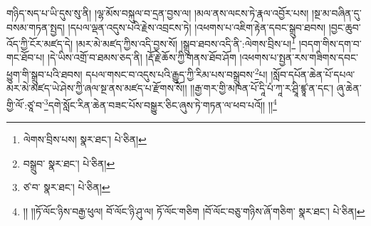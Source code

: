 གཉིད་སད་པ་ཡི་དུས་སུ་ནི། །ལྷ་མོས་བསྐུལ་བ་དྲན་བྱས་ལ། །མལ་ནས་ལངས་ཏེ་རྣལ་འབྱོར་པས། །སྔ་མ་བཞིན་དུ་བསམ་གཏན་སྤྱད། །དཔལ་ལྡན་འདུས་པའི་རྗེས་འབྲངས་ཏེ། །འཕགས་པ་འཇིག་རྟེན་དབང་སྒྲུབ་ཐབས། །བྱང་ཆུབ་འོད་ཀྱི་ངོར་མཛད་དེ། །མར་མེ་མཛད་ཀྱིས་འདི་བྱས་སོ། །སྒྲུབ་ཐབས་འདི་ནི་:ལེགས་བྲིས་པ།\footnote{ལེགས་བྲིས་པས།  སྣར་ཐང་།  པེ་ཅིན། } །བདག་གིས་དག་བ་གང་ཐོབ་པ། །དེ་ཡིས་འགྲོ་བ་ཐམས་ཅད་ནི། །རྡོ་རྗེ་ཆོས་ཀྱི་གནས་ཐོབ་ཤོག །འཕགས་པ་སྤྱན་རས་གཟིགས་དབང་ཕྱུག་གི་སྒྲུབ་པའི་ཐབས། དཔལ་གསང་བ་འདུས་པའི་རྒྱུད་ཀྱི་རིམ་པས་བསྒྲུབས་\footnote{བསྒྲུབ་  སྣར་ཐང་།  པེ་ཅིན། }པ། །སློབ་དཔོན་ཆེན་པོ་དཔལ་མར་མེ་མཛད་ཡེ་ཤེས་ཀྱི་ཞལ་སྔ་ནས་མཛད་པ་རྫོགས་སོ།། །།རྒྱ་གར་གྱི་མཁན་པོ་དཱི་པཾ་ཀཱ་ར་ཤྲཱི་ཛྙཱ་ན་དང་། ཞུ་ཆེན་གྱི་ལོ་:ཙཱ་བ་\footnote{ཙ་བ་  སྣར་ཐང་།  པེ་ཅིན། }དགེ་སློང་རིན་ཆེན་བཟང་པོས་བསྒྱུར་ཅིང་ཞུས་ཏེ་གཏན་ལ་ཕབ་པའོ།། །།\footnote{།། །།ཏོ་ལོང་ཉིས་བརྒྱ་ཕུལ། བོ་ལོང་ཉི་ཤུ་ལ། ཏོ་ལོང་གཅིག །བོ་ལོང་བཅུ་གཉིས་ཞོ་གཅིག་  སྣར་ཐང་།  པེ་ཅིན། }